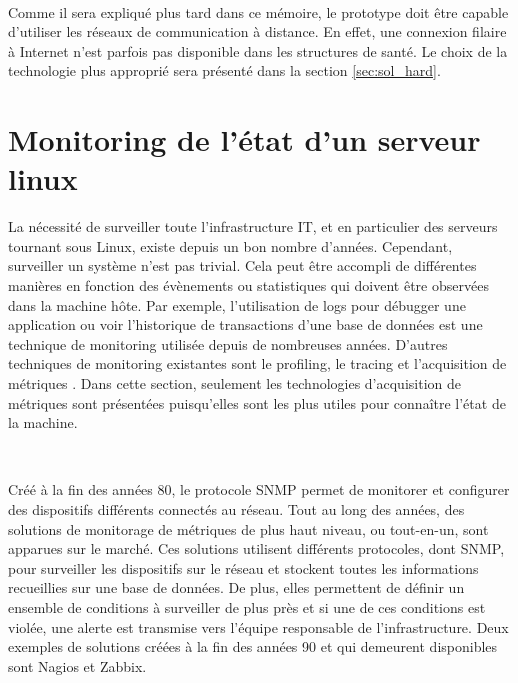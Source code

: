 ~

\noindent
Comme il sera expliqué plus tard dans ce mémoire, le prototype doit être capable d’utiliser les réseaux de communication à distance. En effet, une connexion filaire à Internet n’est parfois pas disponible dans les structures de santé. Le choix de la technologie plus approprié sera présenté dans la section \ref{sec:sol_hard}.


\section{Monitoring de l'état d'un serveur linux}

\noindent
La nécessité de surveiller toute l'infrastructure IT, et en particulier des serveurs tournant sous Linux, existe depuis un bon nombre d'années. Cependant, surveiller un système n'est pas trivial. Cela peut être accompli de différentes manières en fonction des évènements ou statistiques qui doivent être observées dans la machine hôte. Par exemple, l'utilisation de logs pour débugger une application ou voir l'historique de transactions d'une base de données est une technique de monitoring utilisée depuis de nombreuses années. D'autres techniques de monitoring existantes sont le profiling, le tracing et l'acquisition de métriques \cite{brazil2018prometheus}. Dans cette section, seulement les technologies d'acquisition de métriques sont présentées puisqu'elles sont les plus utiles pour connaître l'état de la machine.

~

\noindent
Créé à la fin des années 80, le protocole SNMP \cite{RFC1098, RFC1157} permet de monitorer et configurer des dispositifs différents connectés au réseau. Tout au long des années, des solutions de monitorage de métriques de plus haut niveau, ou tout-en-un, sont apparues sur le marché. Ces solutions utilisent différents protocoles, dont SNMP, pour surveiller les dispositifs sur le réseau et stockent toutes les informations recueillies sur une base de données. De plus, elles permettent de définir un ensemble de conditions à surveiller de plus près et si une de ces conditions est violée, une alerte est transmise vers l'équipe responsable de l'infrastructure. Deux exemples de solutions créées à la fin des années 90 et qui demeurent disponibles sont Nagios et Zabbix.

~


